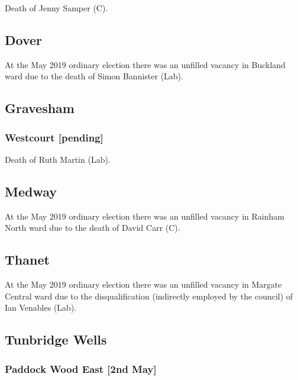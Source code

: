 \documentclass[a4paper,openany]{book}
\begin{document}
\begin{resultsiii}

Death of Jenny Samper (C).

\subsection*{Dover}

At the May 2019 ordinary election there was an unfilled vacancy in Buckland ward due to the death of Simon Bannister (Lab).

\subsection*{Gravesham}

\subsubsection*{Westcourt \hspace*{\fill}\nolinebreak[1]%
	\enspace\hspace*{\fill}
	[pending]}


Death of Ruth Martin (Lab).

\subsection*{Medway}

At the May 2019 ordinary election there was an unfilled vacancy in Rainham North ward due to the death of David Carr (C).

\subsection*{Thanet}

At the May 2019 ordinary election there was an unfilled vacancy in Margate Central ward due to the disqualification (indirectly employed by the council) of Ian Venables (Lab).

\subsection*{Tunbridge Wells}

\subsubsection*{Paddock Wood East \hspace*{\fill}\nolinebreak[1]%
	\enspace\hspace*{\fill}
	[2nd May]}


\end{resultsiii}
\end{document}
